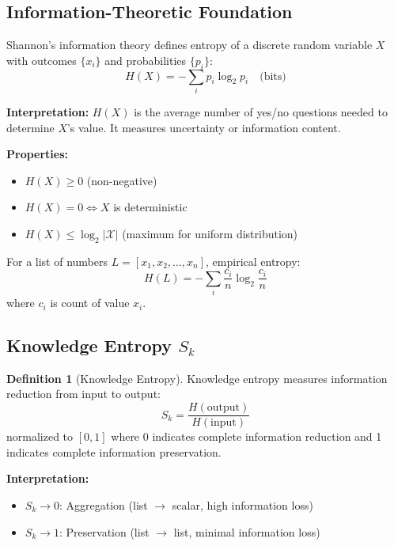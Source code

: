 \documentclass[twocolumn,10pt]{article}
\theoremstyle{definition}
\newtheorem{definition}[theorem]{Definition}
\theoremstyle{remark}
\newcommand{\Sk}{S_k}
\begin{document}
\subsection{Information-Theoretic Foundation}

Shannon's information theory\cite{shannon1948} defines entropy of a discrete random variable $X$ with outcomes $\{x_i\}$ and probabilities $\{p_i\}$:
\begin{equation}
H(X) = -\sum_{i} p_i \log_2 p_i \quad \text{(bits)}
\end{equation}

\noindent\textbf{Interpretation:} $H(X)$ is the average number of yes/no questions needed to determine $X$'s value. It measures uncertainty or information content.

\vspace{0.2cm}
\noindent\textbf{Properties:}
\begin{itemize}
\item $H(X) \geq 0$ (non-negative)
\item $H(X) = 0 \iff X$ is deterministic
\item $H(X) \leq \log_2 |\mathcal{X}|$ (maximum for uniform distribution)
\end{itemize}

For a list of numbers $L = [x_1, x_2, \ldots, x_n]$, empirical entropy:
\begin{equation}
H(L) = -\sum_{i} \frac{c_i}{n} \log_2 \frac{c_i}{n}
\end{equation}
where $c_i$ is count of value $x_i$.

\subsection{Knowledge Entropy $\Sk$}

\begin{definition}[Knowledge Entropy]
\label{def:knowledge_entropy}
Knowledge entropy measures information reduction from input to output:
\begin{equation}
\Sk = \frac{H(\text{output})}{H(\text{input})}
\end{equation}
normalized to $[0,1]$ where 0 indicates complete information reduction and 1 indicates complete information preservation.
\end{definition}

\noindent\textbf{Interpretation:}
\begin{itemize}
\item $\Sk \to 0$: Aggregation (list $\to$ scalar, high information loss)
\item $\Sk \to 1$: Preservation (list $\to$ list, minimal information loss)
\end{itemize}
\end{document}
